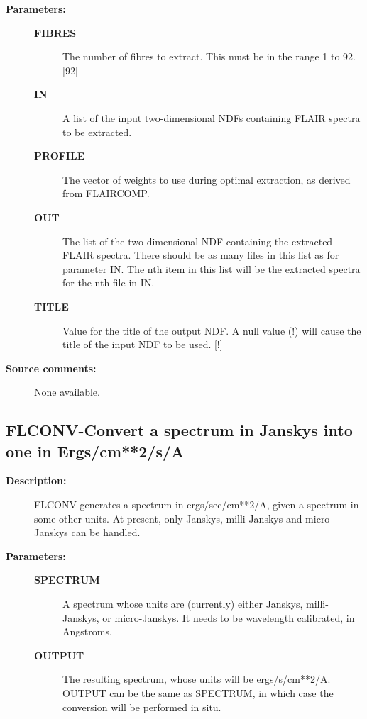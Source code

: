 \begin{description}
\begin{description}
\item [\textbf{Parameters:}]
\begin{description}
\item [\textbf{FIBRES}]
 The number of fibres to extract.  This must be in the range
 1 to 92. [92]
\item [\textbf{IN}]
 A list of the input two-dimensional NDFs containing FLAIR
 spectra to be extracted.
\item [\textbf{PROFILE}]
 The vector of weights to use during optimal extraction, as
 derived from FLAIRCOMP.
\item [\textbf{OUT}]
 The list of the two-dimensional NDF containing the extracted
 FLAIR spectra.  There should be as many files in this list as
 for parameter IN.  The nth item in this list will be the
 extracted spectra for the nth file in IN.
\item [\textbf{TITLE}]
 Value for the title of the output NDF.  A null value (!) will
 cause the title of the input NDF to be used. [!]

\end{description}

\item [\textbf{Source comments:}]
\begin{terminalv}
 None available.

\end{terminalv}
\end{description}
\subsection{FLCONV-\label{FLCONV}Convert a spectrum in Janskys into one in Ergs/cm**2/s/A}
\begin{description}

\item [\textbf{Description:}]
 FLCONV generates a spectrum in ergs/sec/cm**2/A, given a spectrum
 in some other units.  At present, only Janskys, milli-Janskys and
 micro-Janskys can be handled.

\item [\textbf{Parameters:}]
\begin{description}
\item [\textbf{SPECTRUM}]
 A spectrum whose units are (currently) either
 Janskys, milli-Janskys, or micro-Janskys.  It
 needs to be wavelength calibrated, in Angstroms.
\item [\textbf{OUTPUT}]
 The resulting spectrum, whose units will be ergs/s/cm**2/A.
 OUTPUT can be the same as SPECTRUM, in which case the
 conversion will be performed in situ.
\end{description}


\end{description}
\end{description}
